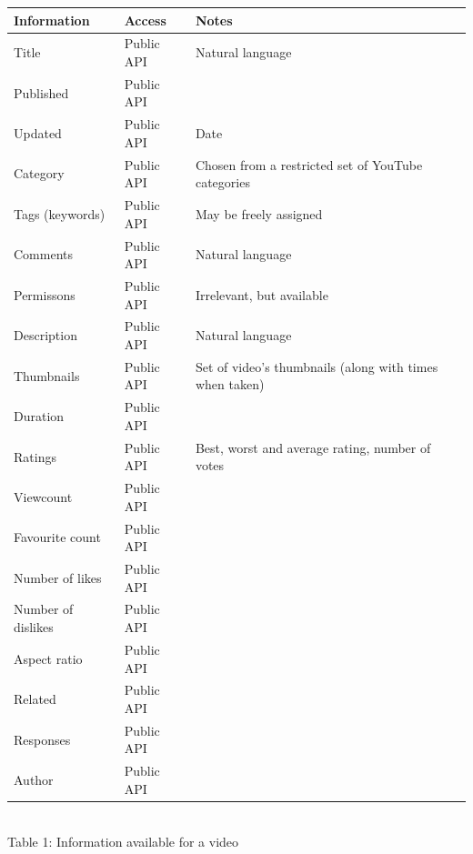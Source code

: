 \begin{center}
  \begin{tabular}{|p{3cm} | l | p{4cm}|} \hline
  Information & Access & Notes\\ \hline
  Title & Public API & Natural language \\
  Published & Public API & \\
  Updated & Public API & Date \\
  Category & Public API & Chosen from a restricted set of YouTube categories \\
  Tags (keywords) & Public API & May be freely assigned \\
  Comments & Public API & Natural language \\
  Permissons & Public API & Irrelevant, but available \\
  Description & Public API & Natural language \\
  Thumbnails & Public API & Set of video's thumbnails (along with times
  when taken) \\
  Duration & Public API & \\
  Ratings & Public API & Best, worst and average rating, number of votes \\
  Viewcount & Public API & \\
  Favourite count & Public API & \\
  Number of likes & Public API & \\
  Number of dislikes & Public API & \\
  Aspect ratio & Public API & \\
  Related & Public API & \\
  Responses & Public API & \\
  Author & Public API & \\ \hline
  \end{tabular} \\
  Table 1: Information available for a video \\
\end{center}

